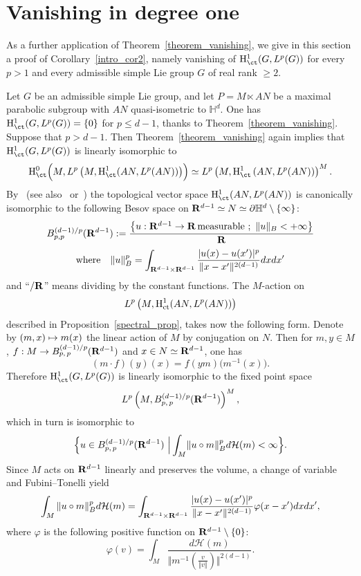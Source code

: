 \section{Vanishing in degree one}\label{9}
As a further application of Theorem~\ref{theorem_vanishing}, we give in this section a proof of Corollary~\ref{intro_cor2}, namely vanishing of ${\rm H}^1 _{\ct} (G, L^p(G))$ for every $p>1$ and every admissible simple Lie group $G$ of real rank $\geqslant 2$.


Let $G$ be an admissible simple Lie group, and let $P = M \ltimes AN$ be a maximal parabolic subgroup with $AN$ quasi-isometric to $\mathbb H ^d$. One has ${\rm H}_{\ct} ^1 (G, L^p (G)) = \{0\}$ for $p \leqslant d-1$, thanks to Theorem~\ref{theorem_vanishing}. Suppose that $p > d-1$. Then Theorem~\ref{theorem_vanishing} again implies that ${\rm H}_{\ct} ^1 (G, L^p (G))$ is linearly isomorphic to
\[
{\rm H}_{\ct}^0 \Bigl(M, L^p \left(M, {\rm H}_{\ct}^1 (AN, L^p (AN))\right)\Bigr) \simeq
L^p \left(M, {\rm H}_{\ct}^1 \left(AN, L^p (AN)\right)\right) ^M.
\]
By~\cite{Pa1} (see also~\cite{Rez} or~\cite{BP2}) the topological vector space ${\rm H}_{\ct} ^1 (AN, L^p (AN))$ is canonically isomorphic to the following Besov space on ${\bf R}^{d-1} \simeq N \simeq \partial \mathbb H ^d \setminus \{\infty \}$:
\[
B^{(d-1)/p} _{p,p} ({\bf R} ^{d-1}) :=
\frac{\left\{u : {\bf R} ^{d-1} \to {\bf R}\,\text{measurable}
~;~\Vert u \Vert _B < +\infty \right\}}{{\bf R}}
\]
\[
\text{where}\quad\Vert u \Vert _B ^p = \int _{{\bf R} ^{d-1} \times {\bf R} ^{d-1}}
\frac{\vert u(x) - u(x') \vert ^p}{\Vert x-x' \Vert ^{2(d-1)}} dxdx'
\]
and ``$/{\bf R}$'' means dividing by the constant functions. The $M$-action on
\[
L^p\left(M, {\rm H}^1 _{\rm ct} (AN, L^p(AN))\right)
\]
described in Proposition~\ref{spectral_prop}, takes now the following form. Denote by $(m, x)\linebreak \mapsto m(x)$ the linear action of $M$ by conjugation on $N$. Then for $m, y \in M$, $f : M \to B^{(d-1)/p} _{p,\,p} ({\bf R} ^{d-1})$ and $x \in N \simeq {\bf R}^{d-1}$, one has
\[
(m \cdot f) (y)(x) = f(ym)\bigl(m ^{-1} (x)\bigr).
\]
Therefore ${\rm H}_{\ct} ^1 (G, L^p (G))$ is linearly isomorphic to the fixed point space
\[
L^p \left(M, B_{p,\,p} ^{(d-1)/p} ({\bf R} ^{d-1}) \right)^M,
\]
which in turn is isomorphic to
\[
\Bigl\{u \in B_{p,\,p} ^{(d-1)/p} ({\bf R} ^{d-1})~\Big\vert \int _M \!\Vert u \circ m \Vert _B ^p d\mathcal H (m)
< \infty \Bigr\}.
\]
Since $M$ acts on ${\bf R} ^{d-1}$ linearly and preserves the volume, a change of variable and Fubini--Tonelli yield
\begin{equation}\label{H^1_eq0}
\int _M \Vert u \circ m \Vert _B ^p d\mathcal H (m) = \int _{{\bf R} ^{d-1} \times {\bf R}^{d-1}} \frac{\vert u(x) - u(x') \vert^p}{\Vert x-x' \Vert^{2(d-1)}}
\varphi (x-x') dxdx',
\end{equation}
where $\varphi$ is the following positive function on ${\bf R} ^{d-1} \setminus \{0 \}$:
\begin{equation}\label{H^1_eq}
\varphi (v) = \int _M \frac{d \mathcal H (m)}{\bigl\Vert m^{-1} \left(\frac{v}{\Vert v \Vert}\right) \bigr\Vert ^{2(d-1)}}.
\end{equation}

